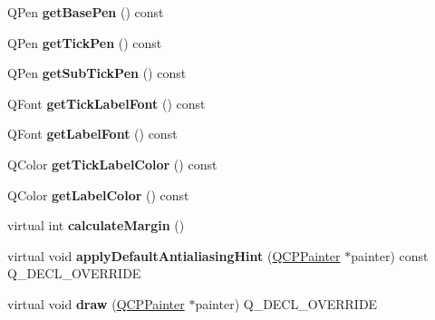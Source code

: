 \begin{DoxyCompactItemize}
\item 
Q\+Pen {\bfseries get\+Base\+Pen} () const \hypertarget{class_q_c_p_axis_a3eb0681d31baf579bb73b86a0153cb02}{}\label{class_q_c_p_axis_a3eb0681d31baf579bb73b86a0153cb02}

\item 
Q\+Pen {\bfseries get\+Tick\+Pen} () const \hypertarget{class_q_c_p_axis_a7f503910be40fb1717e1635be3ef17e1}{}\label{class_q_c_p_axis_a7f503910be40fb1717e1635be3ef17e1}

\item 
Q\+Pen {\bfseries get\+Sub\+Tick\+Pen} () const \hypertarget{class_q_c_p_axis_ab4f7e60a40eb051c775afcaeab895c85}{}\label{class_q_c_p_axis_ab4f7e60a40eb051c775afcaeab895c85}

\item 
Q\+Font {\bfseries get\+Tick\+Label\+Font} () const \hypertarget{class_q_c_p_axis_aef30b66668986523225089a67280ec7a}{}\label{class_q_c_p_axis_aef30b66668986523225089a67280ec7a}

\item 
Q\+Font {\bfseries get\+Label\+Font} () const \hypertarget{class_q_c_p_axis_ab0768eb2879efb202645d19ff789e63e}{}\label{class_q_c_p_axis_ab0768eb2879efb202645d19ff789e63e}

\item 
Q\+Color {\bfseries get\+Tick\+Label\+Color} () const \hypertarget{class_q_c_p_axis_a0f8583f7ac24ccc70d39fdd2389cad6e}{}\label{class_q_c_p_axis_a0f8583f7ac24ccc70d39fdd2389cad6e}

\item 
Q\+Color {\bfseries get\+Label\+Color} () const \hypertarget{class_q_c_p_axis_a42bd69b9e9c571f13624079be18ccdc1}{}\label{class_q_c_p_axis_a42bd69b9e9c571f13624079be18ccdc1}

\item 
virtual int {\bfseries calculate\+Margin} ()\hypertarget{class_q_c_p_axis_a6a84f9634cec70ceb06701ac03039358}{}\label{class_q_c_p_axis_a6a84f9634cec70ceb06701ac03039358}

\item 
virtual void {\bfseries apply\+Default\+Antialiasing\+Hint} (\hyperlink{class_q_c_p_painter}{Q\+C\+P\+Painter} $\ast$painter) const Q\+\_\+\+D\+E\+C\+L\+\_\+\+O\+V\+E\+R\+R\+I\+DE\hypertarget{class_q_c_p_axis_a9d6e83cebc1f2b777cb681782653fad6}{}\label{class_q_c_p_axis_a9d6e83cebc1f2b777cb681782653fad6}

\item 
virtual void {\bfseries draw} (\hyperlink{class_q_c_p_painter}{Q\+C\+P\+Painter} $\ast$painter) Q\+\_\+\+D\+E\+C\+L\+\_\+\+O\+V\+E\+R\+R\+I\+DE\hypertarget{class_q_c_p_axis_a647d98a3f75688b3ec2364c1169dda9e}{}\label{class_q_c_p_axis_a647d98a3f75688b3ec2364c1169dda9e}


\end{DoxyCompactItemize}

